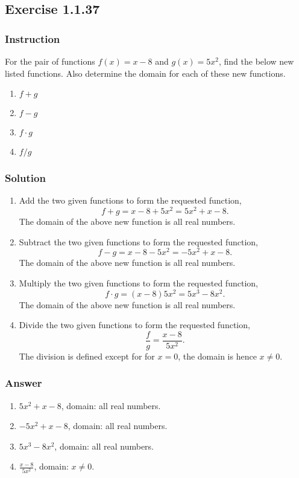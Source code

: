 \documentclass[11pt, letterpaper, oneside]{memoir}
\begin{document}
\subsection*{Exercise 1.1.37}

\subsubsection*{Instruction}

For the pair of functions $ f(x) = x - 8 $ and $ g(x) = 5x^2 $, find the below new listed functions. Also determine the domain for each of these new functions.

\begin{enumerate}[label = (\alph*)]
  \item $ f + g $
  \item $ f - g $
  \item $ f \cdot g $
  \item $ f / g $
\end{enumerate}

\subsubsection*{Solution}

\begin{enumerate}[label = (\alph*)]
  \item
    Add the two given functions to form the requested function,
    $$ \phantom{.}
    f + g = x - 8 + 5x^2 = 5x^2 + x - 8
    .$$
    The domain of the above new function is all real numbers.
  \item
    Subtract the two given functions to form the requested function,
    $$ \phantom{.}
    f - g = x - 8 - 5x^2 = -5x^2 + x - 8
    .$$
    The domain of the above new function is all real numbers.
  \item
    Multiply the two given functions to form the requested function,
    $$ \phantom{.}
    f \cdot g = (x - 8)5x^2 = 5x^3 - 8x^2
    .$$
    The domain of the above new function is all real numbers.
  \item
    Divide the two given functions to form the requested function,
    $$ \phantom{.}
    \frac{f}{g} = \frac{x - 8}{5x^2}
    .$$
    The division is defined except for for $ x = 0 $, the domain is hence $ x \neq 0 $.

\end{enumerate}

\subsubsection*{Answer}

\begin{enumerate}[label = (\alph*)]
  \item
    $ 5x^2 + x - 8 $, domain: all real numbers.
  \item
    $ -5x^2 + x - 8 $, domain: all real numbers.
  \item
    $ 5x^3 - 8x^2 $, domain: all real numbers.
  \item
    $ \frac{x - 8}{5x^2} $, domain: $ x \neq 0 $.
\end{enumerate}
\end{document}
